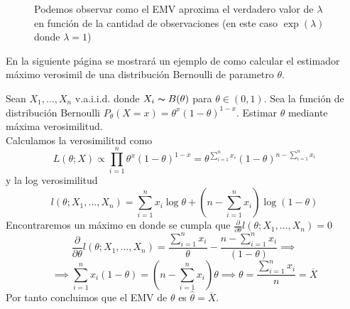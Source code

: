 \begin{figure}[h!]
\begin{center}
        \caption{Podemos observar como el EMV aproxima el verdadero valor de $\lambda$ en función de la cantidad de observaciones (en este caso $\exp(\lambda)$ donde $\lambda = 1$)}

    \end{center}
    \label{fig:exp-log-ver}
\end{figure}

En la siguiente página se mostrará un ejemplo de como calcular el estimador máximo verosimil de una distribución Bernoulli de parametro $\theta$.

\newpage

\begin{exercise}
    Sean $X_1,\dots,X_n$ v.a.i.i.d. donde $X_i \thicksim B(\theta)$ para $\theta \in (0,1)$. Sea la función de distribución Bernoulli $P_\theta(X=x)=\theta^x(1-\theta)^{1-x}$. Estimar $\theta$ mediante máxima verosimilitud. \\
    Calculamos la verosimilitud como
    \[
        L(\theta;X) \propto \prod_{i=1}^{n}\theta^x(1-\theta)^{1-x}=\theta^{\sum_{i=1}^{n}x_i}(1-\theta)^{n-\sum_{i=1}^{n}x_i}
    \]
    y la log verosimilitud
    \[
        l(\theta; X_1,\dots,X_n)=\sum_{i=1}^{n}x_i\log\theta + (n-\sum_{i=1}^{n}x_i)\log(1-\theta)
    \]
    Encontraremos un máximo en donde se cumpla que $\frac{\partial}{\partial\theta}l(\theta;X_1,\dots,X_n)=0$
    \[
        \frac{\partial}{\partial\theta}l(\theta;X_1,\dots,X_n) = \frac{\sum_{i=1}^{n}x_i}{\theta}-\frac{n-\sum_{i=1}^{n}x_i}{(1-\theta)} \implies
    \]
    \[
        \implies \sum_{i=1}^{n}x_i(1-\theta)=(n-\sum_{i=1}^{n}x_i)\theta \implies \theta=\frac{\sum_{i=1}^{n}x_i}{n}=\overline{X}
    \]
    Por tanto concluimos que el EMV de $\theta$ es $\hat{\theta}=\overline{X}$.
\end{exercise}

